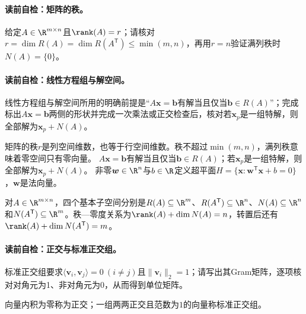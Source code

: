 \paragraph{读前自检：矩阵的秩。}给定$A\in\R^{m\times n}$且$\rank(A)=r$；请核对$r=\dim R(A)=\dim R(A^{\mathsf T})\le\min(m,n)$，再用$r=n$验证满列秩时$N(A)=\{0\}$。\par
\paragraph{读前自检：线性方程组与解空间。}线性方程组与解空间所用的明确前提是“$A\boldsymbol{x}=\boldsymbol{b}$有解当且仅当$\boldsymbol{b}\in R(A)$”；完成标出$A\boldsymbol{x}=\boldsymbol{b}$两侧的形状并完成一次乘法或正交检查后，核对若$\boldsymbol{x}_p$是一组特解，则全部解为$\boldsymbol{x}_p+N(A)$。\par

矩阵的秩$r$是列空间维数，也等于行空间维数。秩不超过$\min(m,n)$，满列秩意味着零空间只有零向量。
$A\boldsymbol{x}=\boldsymbol{b}$有解当且仅当$\boldsymbol{b}\in R(A)$；若$\boldsymbol{x}_p$是一组特解，则全部解为$\boldsymbol{x}_p+N(A)$。
非零$\boldsymbol{w}\in\R^n$与$b\in\R$定义超平面$H=\{\boldsymbol{x}:\boldsymbol{w}^{\mathsf T}\boldsymbol{x}+b=0\}$，$\boldsymbol{w}$是法向量。

对$A\in\R^{m\times n}$，四个基本子空间分别是$R(A)\subseteq\R^m$、$R(A^{\mathsf T})\subseteq\R^n$、$N(A)\subseteq\R^n$和$N(A^{\mathsf T})\subseteq\R^m$。秩—零度关系为$\rank(A)+\dim N(A)=n$，转置后还有$\rank(A)+\dim N(A^{\mathsf T})=m$。


\paragraph{读前自检：正交与标准正交组。}标准正交组要求$\langle\boldsymbol v_i,\boldsymbol v_j\rangle=0\ (i\ne j)$且$\lVert\boldsymbol v_i\rVert_2=1$；请写出其Gram矩阵，逐项核对对角元为1、非对角元为0，从而得到单位矩阵。\par

向量内积为零称为正交；一组两两正交且范数为$1$的向量称标准正交组。

